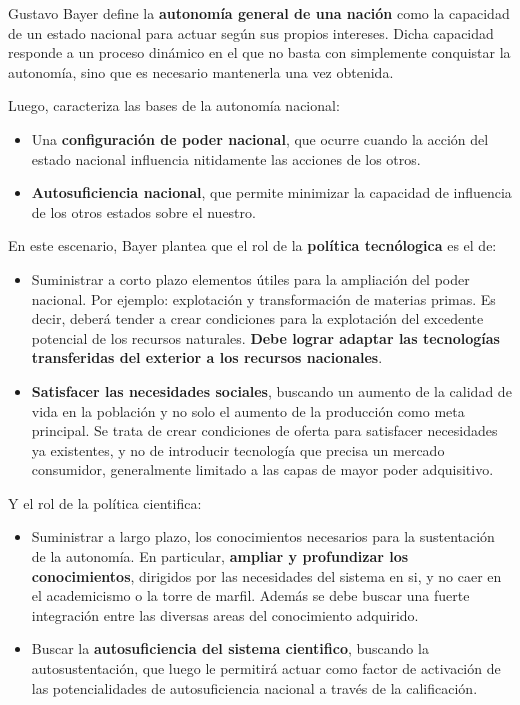 Gustavo Bayer define la \textbf{autonomía general de una nación}  como la capacidad
de un estado nacional para actuar según sus propios intereses. Dicha capacidad
responde a un proceso dinámico en el que no basta con simplemente conquistar la autonomía,
sino que es necesario mantenerla una vez obtenida.

Luego, caracteriza las bases de la autonomía nacional:
\begin{itemize}
    \item Una \textbf{configuración de poder nacional}, que ocurre cuando la acción del estado nacional
        influencia nitidamente las acciones de los otros.
    \item \textbf{Autosuficiencia nacional}, que permite minimizar la capacidad de influencia
        de los otros estados sobre el nuestro.
\end{itemize}

En este escenario, Bayer plantea que el rol de la \textbf{política tecnólogica} es el de:
\begin{itemize}
    \item Suministrar a corto plazo elementos útiles para la ampliación del poder nacional.
        Por ejemplo: explotación y transformación de materias primas. Es decir,
        deberá tender a crear condiciones para la explotación del excedente potencial de los recursos
        naturales. \textbf{Debe lograr adaptar las tecnologías transferidas del exterior a los
        recursos nacionales}.
    \item \textbf{Satisfacer las necesidades sociales}, buscando un aumento de la calidad de vida
        en la población y no solo el aumento de la producción como meta principal.
        Se trata de crear condiciones de oferta para satisfacer necesidades ya existentes,
        y no de introducir tecnología que precisa un mercado consumidor,
        generalmente limitado a las capas de mayor poder adquisitivo.
\end{itemize}

Y el rol de la política cientifica:
\begin{itemize}
    \item Suministrar a largo plazo, los conocimientos necesarios para la sustentación de la autonomía. En particular, \textbf{ampliar y profundizar los conocimientos}, dirigidos por las necesidades del sistema en si, y no caer en el academicismo o la torre de marfil.
        Además se debe buscar una fuerte integración entre las diversas areas del conocimiento adquirido.
    \item Buscar la \textbf{autosuficiencia del sistema cientifico}, buscando la autosustentación, que luego le permitirá actuar como factor de activación de las potencialidades de autosuficiencia nacional a través de la calificación.
\end{itemize}

